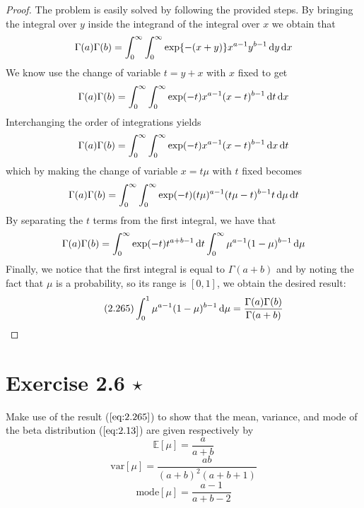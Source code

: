 \begin{proof}
    The problem is easily solved by following the provided steps.
    By bringing the integral over $y$ inside the integrand of 
    the integral over $x$ we obtain that
    \[
        \Gamma(a)\Gamma(b) = \int_{0}^{\infty} \int_{0}^{\infty}
        \exp\{-(x + y)\} x^{a - 1} y^{b - 1} \mathop{}\!\mathrm{d} y \mathop{}\!\mathrm{d} x
    \] 
    We know use the change of variable $t = y+x$ with $x$ fixed
    to get
    \[
        \Gamma(a)\Gamma(b) = \int_{0}^{\infty} \int_{0}^{\infty}
        \exp(-t) x^{a - 1} (x - t)^{b - 1} \mathop{}\!\mathrm{d} t \mathop{}\!\mathrm{d} x
    \] 
    Interchanging the order of integrations yields
    \[
        \Gamma(a)\Gamma(b) = \int_{0}^{\infty} \int_{0}^{\infty}
        \exp(-t) x^{a - 1} (x - t)^{b - 1} \mathop{}\!\mathrm{d} x \mathop{}\!\mathrm{d} t
    \] 
    which by making the change of variable $x = t\mu$ with $t$ fixed
    becomes
    \[
        \Gamma(a)\Gamma(b) = \int_{0}^{\infty} \int_{0}^{\infty}
        \exp(-t) (t\mu)^{a - 1} (t\mu - t)^{b - 1} t \mathop{}\!\mathrm{d} \mu \mathop{}\!\mathrm{d} t
    \] 
    By separating the $t$ terms from the first integral, we have that
     \[
         \Gamma(a)\Gamma(b) = \int_{0}^{\infty} 
         \exp(-t) t^{a + b - 1} \mathop{}\!\mathrm{d} t
         \int_{0}^{\infty} \mu^{a - 1}(1 - \mu)^{b - 1} \mathop{}\!\mathrm{d} \mu
    \] 
    Finally, we notice that the first integral is equal to $\Gamma(a+b)$ 
    and by noting the fact that $\mu$ is a probability, so its
    range is $[0, 1]$, we obtain the desired result:
    \begin{equation*}\tag{2.265}
        \int_{0}^{1} \mu^{a-1}(1 - \mu)^{b - 1} \mathop{}\!\mathrm{d} \mu = \frac{\Gamma(a)\Gamma(b)}{\Gamma(a+b)}
    \end{equation*}
\end{proof}

\section*{Exercise 2.6 $\star$} 
Make use of the result ($\ref{eq:2.265}$) to show that the mean,
variance, and mode of the beta distribution ($\ref{eq:2.13}$) are given 
respectively by 
\begin{equation*}
    \mathbb{E}[\mu] = \frac{a}{a + b}
    \tag{2.267}\label{eq:2.267}
\end{equation*}
\begin{equation*}
    \text{var}[\mu] = \frac{ab}{(a + b)^2(a + b + 1)}
    \tag{2.268}\label{eq:2.268}
\end{equation*}
\begin{equation*}
    \text{mode}[\mu] = \frac{a - 1}{a + b - 2}
    \tag{2.269}\label{eq:2.269}
\end{equation*}

